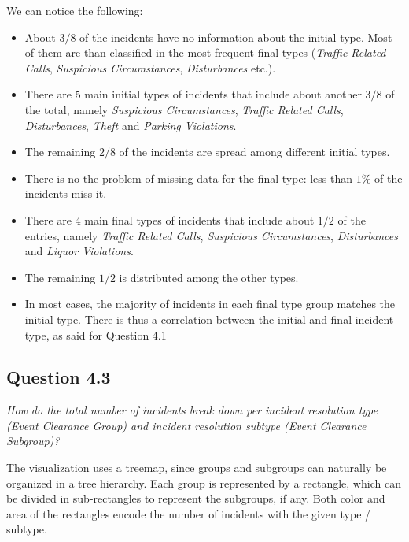 We can notice the following:
\begin{itemize}
	\item About $3/8$ of the incidents have no information about the initial type. Most of them are than classified in the most frequent final types (\textit{Traffic Related Calls}, \textit{Suspicious Circumstances}, \textit{Disturbances} etc.).
	\item There are $5$ main initial types of incidents that include about another $3/8$ of the total, namely \textit{Suspicious Circumstances}, \textit{Traffic Related Calls}, \textit{Disturbances}, \textit{Theft} and \textit{Parking Violations}.
	\item The remaining $2/8$ of the incidents are spread among different initial types.
	\item There is no the problem of missing data for the final type: less than $1\%$ of the incidents miss it.
	\item There are $4$ main final types of incidents that include about $1/2$ of the entries, namely \textit{Traffic Related Calls}, \textit{Suspicious Circumstances}, \textit{Disturbances} and \textit{Liquor Violations}.
	\item The remaining $1/2$ is distributed among the other types.
	\item In most cases, the majority of incidents in each final type group matches the initial type. There is thus a correlation between the initial and final incident type, as said for Question 4.1
\end{itemize}


\subsection*{Question 4.3}
\textit{How do the total number of incidents break down per incident resolution type (Event Clearance Group) and incident resolution subtype (Event Clearance Subgroup)?}

The visualization uses a treemap, since groups and subgroups can naturally be organized in a tree hierarchy.
Each group is represented by a rectangle, which can be divided in sub-rectangles to represent the subgroups, if any.
Both color and area of the rectangles encode the number of incidents with the given type / subtype.

